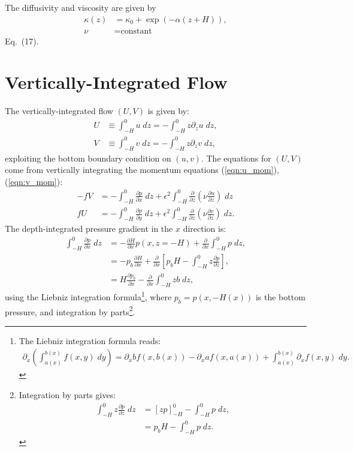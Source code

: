 \documentclass[10pt]{amsart}
\begin{document}
The diffusivity and viscosity are given by
\begin{align}
\kappa(z) & = \kappa_0 + \exp \left( - \alpha (z + H) \right) , \label{eqn:kappa_def} \\
\nu & = \text{constant}
\end{align}
\citet{peterson&callies26} Eq.~(17).

\section{Vertically-Integrated Flow}
The vertically-integrated flow $(U, V)$ is given by:
\begin{align}
U & \equiv \int_{-H}^{0} u \; dz = - \int_{-H}^0 z \partial_z u \; dz , \nonumber \\
V & \equiv \int_{-H}^{0} v \; dz = - \int_{-H}^0 z \partial_z v \; dz ,
\label{eqn:UV_defs}
\end{align}
exploiting the bottom boundary condition on $(u, v)$.
The equations for $(U, V)$ come from vertically integrating the momentum equations (\ref{eqn:u_mom}), (\ref{eqn:v_mom}):
\begin{align}
- f V & = -  \int_{-H}^{0} \frac{\partial p}{\partial x} \; dz + \epsilon^2   \int_{-H}^{0} \frac{\partial}{\partial z} \left( \nu \frac{\partial u}{\partial z} \right) \; dz \label{eqn:U_mom0} \\
f  U & = -  \int_{-H}^{0} \frac{\partial p}{\partial y} \; dz + \epsilon^2  \int_{-H}^{0} \frac{\partial}{\partial z} \left( \nu \frac{\partial v}{\partial z} \right) \; dz . \label{eqn:V_mom0}
\end{align}
The depth-integrated pressure gradient in the $x$ direction is:
\begin{align}
 \int_{-H}^{0} \frac{\partial p}{\partial x} \; dz & = - \frac{\partial H}{\partial x} p(x,z = -H) +  \frac{\partial }{\partial x} \int_{-H}^0 p \; dz , \\
 & = - p_b \frac{\partial H}{\partial x} + \frac{\partial }{\partial x} \left[ p_b H - \int_{-H}^0 z \frac{\partial p}{\partial z}  \right], \\
  & = H \frac{\partial p_b}{\partial x} - \frac{\partial }{\partial x} \int_{-H}^0 z b \; dz ,
 \end{align}
 using the Liebniz integration formula\footnote{The Liebniz integration formula reads:
 \begin{align}
 \partial_x \left( \int_{a(x)}^{b(x)} f(x,y) \; dy \right) = \partial_x b f(x,b(x)) - \partial_x a f(x,a(x)) +  \int_{a(x)}^{b(x)} \partial_x f(x, y) \; dy . \nonumber
 \end{align}
 }, where $p_b = p(x,-H(x))$ is the bottom pressure, and integration by parts\footnote{
 Integration by parts gives:
 \begin{align}
\int_{-H}^0 z \frac{\partial p}{\partial z} \; dz & = \left[ z p \right]_{-H}^0 -   \int_{-H}^0 p \; dz , \nonumber \\ 
& = p_b H -  \int_{-H}^0 p \; dz . \nonumber
 \end{align}
 }.
\end{document}
